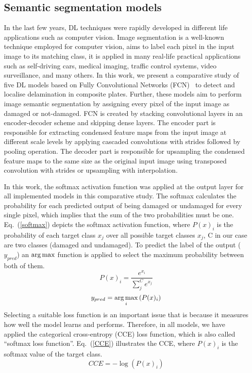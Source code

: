 \subsection{Semantic segmentation models}
\label{section:semantic_segmentation}
In the last few years, DL techniques were rapidly developed in different life applications such as computer vision.  
Image segmentation is a well-known technique employed for computer vision, aims to label each pixel in the input image to its matching class, it is applied in many real-life practical applications such as self-driving cars, medical imaging, traffic control systems, video surveillance, and many others.
In this work, we present a comparative study of five DL models based on Fully Convolutional Networks (FCN)~\cite{Long} to detect and localise delamination in composite plates.
Further, these models aim to perform image semantic segmentation by assigning every pixel of the input image as damaged or not-damaged. 
FCN is created by stacking convolutional layers in an encoder-decoder scheme and skipping dense layers. 
The encoder part is responsible for extracting condensed feature maps from the input image at different scale levels by applying cascaded convolutions with strides followed by pooling operation.
The decoder part is responsible for upsampling the condensed feature maps to the same size as the original input image using transposed convolution with strides or upsampling with interpolation.

In this work, the softmax activation function was applied at the output layer for all implemented models in this comparative study.
The softmax calculates the probability for each predicted output of being damaged or undamaged for every single pixel, which implies that the sum of the two probabilities must be one. 
Eq.~(\ref{softmax}) depicts the softmax activation function, where \(P(x)_{i}\) is the probability of each target class \(x_{j}\) over all possible target classes \(x_{j}\), C in our case are two classes  (damaged and undamaged).
To predict the label of the output (\(y_{pred}\)) an \(\operatorname*{arg\,max}\) function is applied to select the maximum probability between both of them.
	\begin{equation}
		P(x)_{i} = \frac{e^{x_{i}}}{\sum_{j}^{C} e^{x_{j}}}
		\label{softmax}
	\end{equation} 
	\begin{equation}
		y_{pred} = \operatorname*{arg\,max}_{i}\left( P(x)_{i} \right)
		\label{argmax}
	\end{equation}
Selecting a suitable loss function is an important issue that is because it measures how well the model learns and performs.
Therefore, in all models, we have applied the categorical cross-entropy (CCE) loss function, which is also called \enquote{softmax loss function}.
Eq.~(\ref{CCE}) illustrates the CCE, where \( P(x)_{i}\) is the softmax value of the target class. 
	\begin{equation}
	CCE = -\log\left( P(x)_{i} \right)
	\label{CCE}
	\end{equation}

